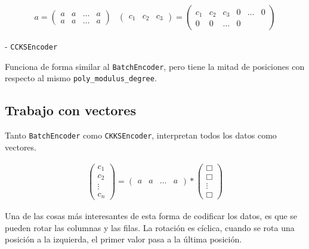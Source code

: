     \begin{gather}
      a =
      \begin{pmatrix}
        a & a & \hdots & a \\
        a & a & \hdots & a
      \end{pmatrix} &
      \begin{pmatrix}
        c_1 & c_2 & c_3
      \end{pmatrix}
      =
      \begin{pmatrix}
        c_1 & c_2 & c_3 & 0 & \hdots &  0 \\
        0 & 0 & \hdots &  0
      \end{pmatrix}
    \end{gather}

    - \verb|CCKSEncoder|

    Funciona de forma similar al \verb|BatchEncoder|, pero tiene la mitad de posiciones con respecto al mismo \verb|poly_modulus_degree|.

\subsection{Trabajo con vectores}

Tanto \verb|BatchEncoder| como \verb|CKKSEncoder|, interpretan todos los datos como vectores.

\begin{gather}
  \begin{pmatrix}
    c_1 \\
    c_2 \\
    \vdots{} \\
    c_n
  \end{pmatrix}
  =
  \begin{pmatrix}
    a & a & \hdots{} &  a
  \end{pmatrix}
  *
  \begin{pmatrix}
    \Box \\
    \Box \\
    \vdots{} \\
    \Box
  \end{pmatrix}
\end{gather}

Una de las cosas más interesantes de esta forma de codificar los datos, es que se pueden rotar las columnas y las filas. La rotación es cíclica, cuando se rota una posición a la izquierda, el primer valor pasa a la última posición.

%
%
%
%
%
%
%

